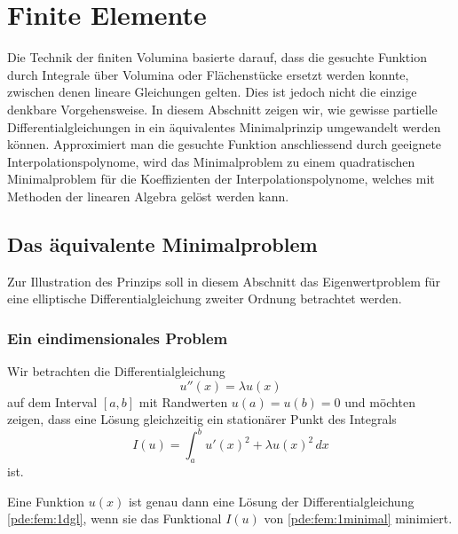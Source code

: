%
%
%
\section{Finite Elemente
\label{section:finite-elemente}}
Die Technik der finiten Volumina basierte darauf, dass die gesuchte
Funktion durch Integrale über Volumina oder Flächenstücke ersetzt 
werden konnte, zwischen denen lineare Gleichungen gelten.
Dies ist jedoch nicht die einzige denkbare Vorgehensweise.
In diesem Abschnitt zeigen wir, wie gewisse partielle Differentialgleichungen
in ein äquivalentes Minimalprinzip umgewandelt werden können.
Approximiert man die gesuchte Funktion anschliessend durch geeignete
Interpolationspolynome, wird das Minimalproblem zu einem quadratischen
Minimalproblem für die Koeffizienten der Interpolationspolynome,
welches mit Methoden der linearen Algebra gelöst werden kann.

\subsection{Das äquivalente Minimalproblem}
Zur Illustration des Prinzips soll in diesem Abschnitt das Eigenwertproblem
für eine elliptische Differentialgleichung zweiter Ordnung betrachtet werden.

\subsubsection{Ein eindimensionales Problem}
Wir betrachten die Differentialgleichung
\begin{equation}
u''(x) = \lambda u(x)
\label{pde:fem:1dgl}
\end{equation}
auf dem Interval $[a,b]$ mit Randwerten  $u(a)=u(b)=0$
und möchten zeigen, dass eine Lösung gleichzeitig ein stationärer
Punkt des Integrals
\begin{equation}
I(u)
=
\int_a^b u'(x)^2 + \lambda u(x)^2 \,dx
\label{pde:fem:1minimal}
\end{equation}
ist.

\begin{satz}
\label{pde:satz:minimal1}
Eine Funktion $u(x)$ ist genau dann eine Lösung der Differentialgleichung
\eqref{pde:fem:1dgl}, wenn sie das Funktional
$I(u)$ von \eqref{pde:fem:1minimal} minimiert.
\end{satz}

